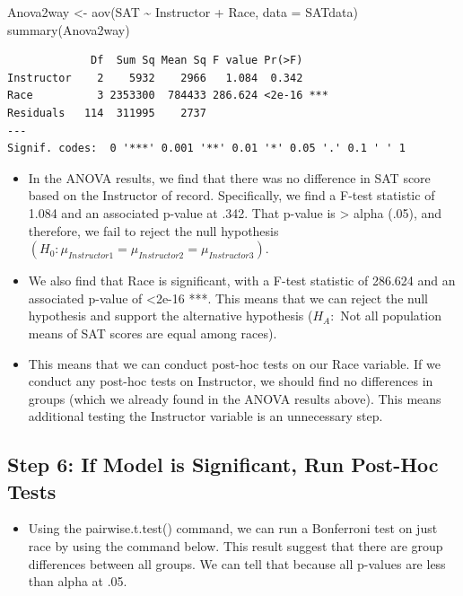 \documentclass[
  letterpaper,
  DIV=11,
  numbers=noendperiod]{scrreprt}
\newenvironment{Shaded}{\begin{snugshade}}{\end{snugshade}}
\newcommand{\AttributeTok}[1]{\textcolor[rgb]{0.40,0.45,0.13}{#1}}
\newcommand{\FunctionTok}[1]{\textcolor[rgb]{0.28,0.35,0.67}{#1}}
\newcommand{\NormalTok}[1]{\textcolor[rgb]{0.00,0.23,0.31}{#1}}
\newcommand{\OtherTok}[1]{\textcolor[rgb]{0.00,0.23,0.31}{#1}}
\newcommand{\SpecialCharTok}[1]{\textcolor[rgb]{0.37,0.37,0.37}{#1}}
\providecommand{\tightlist}{%
  \setlength{\itemsep}{0pt}\setlength{\parskip}{0pt}}\usepackage{longtable,booktabs,array}
\begin{document}
\begin{Shaded}
\begin{Highlighting}[]
\NormalTok{Anova2way }\OtherTok{\textless{}{-}} \FunctionTok{aov}\NormalTok{(SAT }\SpecialCharTok{\textasciitilde{}}\NormalTok{ Instructor }\SpecialCharTok{+}\NormalTok{ Race, }\AttributeTok{data =}\NormalTok{ SATdata)}
\FunctionTok{summary}\NormalTok{(Anova2way)}
\end{Highlighting}
\end{Shaded}

\begin{verbatim}
             Df  Sum Sq Mean Sq F value Pr(>F)    
Instructor    2    5932    2966   1.084  0.342    
Race          3 2353300  784433 286.624 <2e-16 ***
Residuals   114  311995    2737                   
---
Signif. codes:  0 '***' 0.001 '**' 0.01 '*' 0.05 '.' 0.1 ' ' 1
\end{verbatim}

\begin{itemize}
\item
  In the ANOVA results, we find that there was no difference in SAT
  score based on the Instructor of record. Specifically, we find a
  F-test statistic of 1.084 and an associated p-value at .342. That
  p-value is \textgreater{} alpha (.05), and therefore, we fail to
  reject the null hypothesis
  \((H_0:  \mu_{Instructor1} = \mu_{Instructor2}= \mu_{Instructor3})\).
\item
  We also find that Race is significant, with a F-test statistic of
  286.624 and an associated p-value of \textless2e-16 ***. This means
  that we can reject the null hypothesis and support the alternative
  hypothesis (\(H_A:\) Not all population means of SAT scores are equal
  among races).
\item
  This means that we can conduct post-hoc tests on our Race variable. If
  we conduct any post-hoc tests on Instructor, we should find no
  differences in groups (which we already found in the ANOVA results
  above). This means additional testing the Instructor variable is an
  unnecessary step.
\end{itemize}

\subsection{Step 6: If Model is Significant, Run Post-Hoc
Tests}\label{step-6-if-model-is-significant-run-post-hoc-tests-1}

\begin{itemize}
\tightlist
\item
  Using the pairwise.t.test() command, we can run a Bonferroni test on
  just race by using the command below. This result suggest that there
  are group differences between all groups. We can tell that because all
  p-values are less than alpha at .05.\\
\end{itemize}
\end{document}
